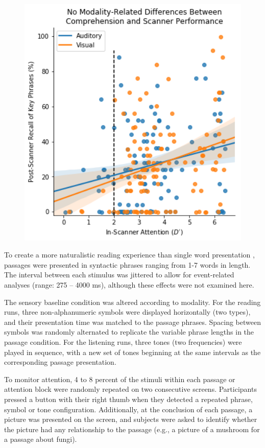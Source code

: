 \begin{figure}[tp]
	\centering
	\includegraphics[width=5in]{images/ch2-eprime-recall.png}
	\caption[Schematic of the reading comprehension task.]
	\label{fig:ch2-task-design}
\end{figure}

To create a more naturalistic reading experience than single word presentation \citep{Rayner1986}, passages were presented in syntactic phrases ranging from 1-7 words in length. The interval between each stimulus was jittered to allow for event-related analyses (range: 275 – 4000 ms), although these effects were not examined here.

The sensory baseline condition was altered according to modality. For the reading runs, three non-alphanumeric symbols were displayed horizontally (two types), and their presentation time was matched to the passage phrases. Spacing between symbols was randomly alternated to replicate the variable phrase lengths in the passage condition. For the listening runs, three tones (two frequencies) were played in sequence, with a new set of tones beginning at the same intervals as the corresponding passage presentation. 

To monitor attention, 4 to 8 percent of the stimuli within each passage or attention block were randomly repeated on two consecutive screens.  Participants pressed a button with their right thumb when they detected a repeated phrase, symbol or tone configuration. Additionally, at the conclusion of each passage, a picture was presented on the screen, and subjects were asked to identify whether the picture had any relationship to the passage (e.g., a picture of a mushroom for a passage about fungi). 

